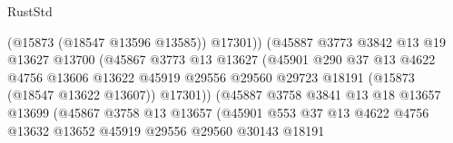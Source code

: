 \begin{lexlean}{RustStd}
\begin{coremodule}
                                          (@15873 (@18547 @13596 @13585))
                                          @17301))
                                      (@45887
                                        @3773
                                        @3842
                                        @13
                                        @19
                                        @13627
                                        @13700
                                        (@45867
                                          @3773
                                          @13
                                          @13627
                                          (@45901
                                            @290
                                            @37
                                            @13
                                            @4622
                                            @4756
                                            @13606
                                            @13622
                                            @45919
                                            @29556
                                            @29560
                                            @29723
                                            @18191
                                            (@15873 (@18547 @13622 @13607))
                                            @17301))
                                        (@45887
                                          @3758
                                          @3841
                                          @13
                                          @18
                                          @13657
                                          @13699
                                          (@45867
                                            @3758
                                            @13
                                            @13657
                                            (@45901
                                              @553
                                              @37
                                              @13
                                              @4622
                                              @4756
                                              @13632
                                              @13652
                                              @45919
                                              @29556
                                              @29560
                                              @30143
                                              @18191

\end{coremodule}
\end{lexlean}
